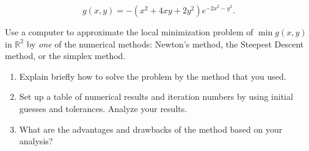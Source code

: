 \documentclass[11pt,oneside]{extarticle}
\newcommand{\Real}{\mathbb{R}}
\begin{document}
$$g(x,y) = -\left( x^2 + 4xy + 2y^2 \right) e^{ -2x^2 - y^2 }.$$

Use a computer to approximate the local minimization problem of $\min g(x,y)$
in $\Real^2$ by \emph{one} of the numerical methods: Newton's method, the Steepest
Descent method, or the simplex method.

\begin{enumerate}

    \item Explain briefly how to solve the problem by the method that you used.

    \item Set up a table of numerical results and iteration numbers by using
        initial guesses and tolerances. Analyze your results.

    \item What are the advantages and drawbacks of the method based on your
        analysis?

\end{enumerate}
\end{document}
